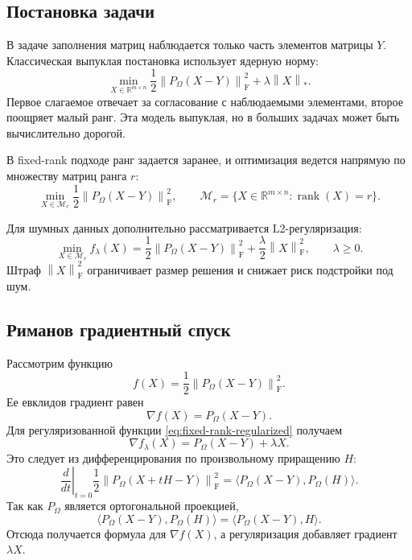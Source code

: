 \documentclass[a4paper,12pt]{article}
\newcommand{\R}{\mathbb{R}}
\newcommand{\fro}[1]{\left\lVert #1 \right\rVert_{\mathrm F}}
\newcommand{\nuc}[1]{\left\lVert #1 \right\rVert_*}
\newcommand{\rank}{\operatorname{rank}}
\renewcommand{\Proj}{P}
\newcommand{\Mcal}{\mathcal{M}}
\begin{document}
\subsection{Постановка задачи}

В задаче заполнения матриц наблюдается только часть элементов матрицы $Y$. Классическая выпуклая постановка использует ядерную норму:
\begin{equation}
    \label{eq:convex-final}
    \min_{X \in \R^{m\times n}}
    \frac12 \fro{\Proj_\Omega(X-Y)}^2 + \lambda \nuc{X}.
\end{equation}
Первое слагаемое отвечает за согласование с наблюдаемыми элементами, второе поощряет малый ранг. Эта модель выпуклая, но в больших задачах может быть вычислительно дорогой.

В fixed-rank подходе ранг задается заранее, и оптимизация ведется напрямую по множеству матриц ранга $r$:
\begin{equation}
    \label{eq:fixed-rank-final}
    \min_{X \in \Mcal_r}
    \frac12 \fro{\Proj_\Omega(X-Y)}^2,
    \qquad
    \Mcal_r=\{X\in\R^{m\times n}:\rank(X)=r\}.
\end{equation}

Для шумных данных дополнительно рассматривается L2-регуляризация:
\begin{equation}
    \label{eq:fixed-rank-regularized}
    \min_{X \in \Mcal_r} f_\lambda(X)
    = \frac12 \fro{\Proj_\Omega(X-Y)}^2 + \frac{\lambda}{2}\fro{X}^2,
    \qquad \lambda\ge 0.
\end{equation}
Штраф $\fro{X}^2$ ограничивает размер решения и снижает риск подстройки под шум.

\subsection{Риманов градиентный спуск}

Рассмотрим функцию
\[
    f(X)=\frac12\fro{\Proj_\Omega(X-Y)}^2.
\]
Ее евклидов градиент равен
\[
    \nabla f(X)=\Proj_\Omega(X-Y).
\]
Для регуляризованной функции \eqref{eq:fixed-rank-regularized} получаем
\[
    \nabla f_\lambda(X)=\Proj_\Omega(X-Y)+\lambda X.
\]
Это следует из дифференцирования по произвольному приращению $H$:
\[
    \left.\frac{d}{dt}\right|_{t=0}
    \frac12\fro{\Proj_\Omega(X+tH-Y)}^2
    =
    \langle \Proj_\Omega(X-Y),\Proj_\Omega(H)\rangle.
\]
Так как $\Proj_\Omega$ является ортогональной проекцией,
\[
    \langle \Proj_\Omega(X-Y),\Proj_\Omega(H)\rangle
    =
    \langle \Proj_\Omega(X-Y),H\rangle.
\]
Отсюда получается формула для $\nabla f(X)$, а регуляризация добавляет градиент $\lambda X$.
\end{document}
